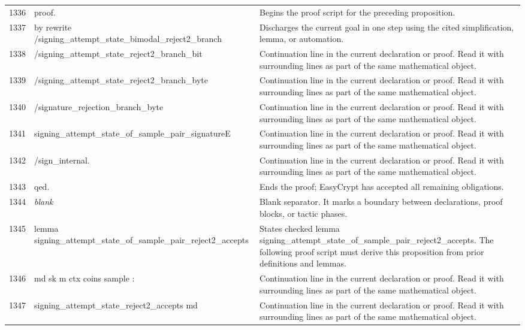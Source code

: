 \documentclass[10pt]{article}
\begin{document}
\begin{longtable}{r L{0.53\textwidth} L{0.37\textwidth}}
1336 & {\ttfamily\scriptsize proof.} & Begins the proof script for the preceding proposition. \\
1337 & {\ttfamily\scriptsize by rewrite /signing\_attempt\_state\_bimodal\_reject2\_branch} & Discharges the current goal in one step using the cited simplification, lemma, or automation. \\
1338 & {\ttfamily\scriptsize            /signing\_attempt\_state\_reject2\_branch\_bit} & Continuation line in the current declaration or proof.  Read it with surrounding lines as part of the same mathematical object. \\
1339 & {\ttfamily\scriptsize            /signing\_attempt\_state\_reject2\_branch\_byte} & Continuation line in the current declaration or proof.  Read it with surrounding lines as part of the same mathematical object. \\
1340 & {\ttfamily\scriptsize            /signature\_rejection\_branch\_byte} & Continuation line in the current declaration or proof.  Read it with surrounding lines as part of the same mathematical object. \\
1341 & {\ttfamily\scriptsize            signing\_attempt\_state\_of\_sample\_pair\_signatureE} & Continuation line in the current declaration or proof.  Read it with surrounding lines as part of the same mathematical object. \\
1342 & {\ttfamily\scriptsize            /sign\_internal.} & Continuation line in the current declaration or proof.  Read it with surrounding lines as part of the same mathematical object. \\
1343 & {\ttfamily\scriptsize qed.} & Ends the proof; EasyCrypt has accepted all remaining obligations. \\
1344 & {\ttfamily\scriptsize \emph{blank}} & Blank separator.  It marks a boundary between declarations, proof blocks, or tactic phases. \\
1345 & {\ttfamily\scriptsize lemma signing\_attempt\_state\_of\_sample\_pair\_reject2\_accepts} & States checked lemma signing\_attempt\_state\_of\_sample\_pair\_reject2\_accepts.  The following proof script must derive this proposition from prior definitions and lemmas. \\
1346 & {\ttfamily\scriptsize    md sk m ctx coins sample :} & Continuation line in the current declaration or proof.  Read it with surrounding lines as part of the same mathematical object. \\
1347 & {\ttfamily\scriptsize   signing\_attempt\_state\_reject2\_accepts md} & Continuation line in the current declaration or proof.  Read it with surrounding lines as part of the same mathematical object. \\

\end{longtable}
\end{document}
